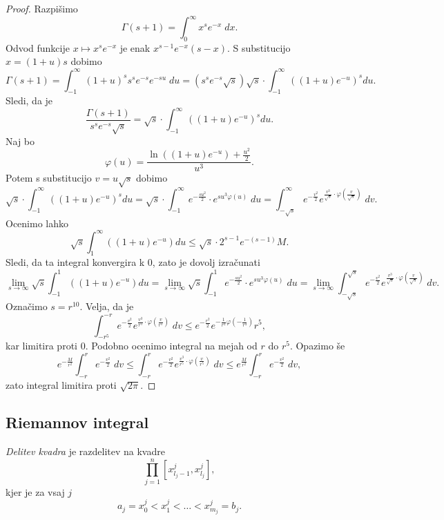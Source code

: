 \begin{proof}
Razpišimo
\[
\Gamma(s+1) = \int_0^\infty x^s e^{-x}\;dx.
\]
Odvod funkcije $x \mapsto x^s e^{-x}$ je enak $x^{s-1}e^{-x}(s-x)$.
S substitucijo $x = (1+u)s$ dobimo
\[
\Gamma(s+1) =
\int_{-1}^{\infty} (1+u)^s s^s e^{-s} e^{-su}\;du =
\left(s^s e^{-s} \sqrt{s}\right) \sqrt{s} \cdot
\int_{-1}^\infty \left((1+u)e^{-u}\right)^s du.
\]
Sledi, da je
\[
\frac{\Gamma(s+1)}{s^s e^{-s}\sqrt{s}} =
\sqrt{s} \cdot \int_{-1}^\infty \left((1+u)e^{-u}\right)^s du.
\]
Naj bo
\[
\varphi(u) = \frac{\ln((1+u)e^{-u}) + \frac{u^2}{2}}{u^3}.
\]
Potem s substitucijo $v = u \sqrt{s}$ dobimo
\[
\sqrt{s} \cdot \int_{-1}^\infty \left((1+u)e^{-u}\right)^s du =
\sqrt{s} \cdot \int_{-1}^\infty
e^{-\frac{su^2}{2}} \cdot e^{su^3\varphi(u)}\;du =
\int_{-\sqrt{s}}^{\infty}
e^{-\frac{v^2}{2}} e^{\frac{v^3}{\sqrt{s}} \cdot \varphi\left(
\frac{v}{\sqrt{s}}
\right)}\;dv.
\]
Ocenimo lahko
\[
\sqrt{s} \int_1^\infty \left((1+u)e^{-u}\right)du \leq
\sqrt{s} \cdot 2^{s-1} e^{-(s-1)} M.
\]
Sledi, da ta integral konvergira k $0$, zato je dovolj izračunati
\[
\lim_{s \to \infty}
\sqrt{s} \int_{-1}^{1} \left((1+u)e^{-u}\right)du =
\lim_{s \to \infty} \sqrt{s} \int_{-1}^{1}
e^{-\frac{su^2}{2}} \cdot e^{su^3\varphi(u)}\;du =
\lim_{s \to \infty} \int_{-\sqrt{s}}^{\sqrt{s}}
e^{-\frac{v^2}{2}} e^{\frac{v^3}{\sqrt{s}} \cdot \varphi\left(
\frac{v}{\sqrt{s}}
\right)}\;dv.
\]
Označimo $s = r^{10}$. Velja, da je
\[
\int_{-r^5}^{-r}
e^{-\frac{v^2}{2}} e^{\frac{v^3}{r^5} \cdot \varphi\left(
\frac{v}{r^5}
\right)}\;dv \leq e^{-\frac{r^2}{2}} e^{-\frac{1}{r^2} \varphi
\left(-\frac{1}{r^4}\right)} r^5,
\]
kar limitira proti 0. Podobno ocenimo integral na mejah od $r$ do
$r^5$. Opazimo še
\[
e^{-\frac{M}{r^2}} \int_{-r}^{r} e^{-\frac{v^2}{2}}\;dv \leq
\int_{-r}^{r}
e^{-\frac{v^2}{2}} e^{\frac{v^3}{r^5} \cdot \varphi\left(
\frac{v}{r^5}
\right)}\;dv \leq
e^{\frac{M}{r^2}} \int_{-r}^{r} e^{-\frac{v^2}{2}}\;dv,
\]
zato integral limitira proti $\sqrt{2\pi}$.
\end{proof}

\newpage

\subsection{Riemannov integral}

\begin{definicija}
\emph{Delitev kvadra} je razdelitev na kvadre
\[
\prod_{j=1}^n \left[x_{l_j-1}^j, x_{l_j}^j\right],
\]
kjer je za vsaj $j$
\[
a_j = x_0^j < x_1^j < \dots < x_{m_j}^j = b_j.
\]
\end{definicija}

